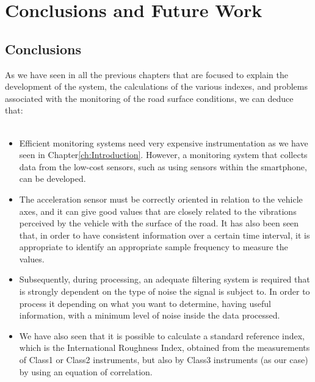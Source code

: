 \documentclass[tesi]{subfiles}
\begin{document}
\chapter{Conclusions and Future Work}\label{ch:c_and_fw}
\section{Conclusions}
As we have seen in all the previous chapters that are focused to explain the development of the system, the calculations of the various indexes, and problems associated with the monitoring of the road surface conditions, we can deduce that:\\\\
\begin{itemize}
\item Efficient monitoring systems need very expensive instrumentation as we have seen in Chapter\ref{ch:Introduction}. However, a monitoring system that collects data from the low-cost sensors, such as using sensors within the smartphone, can be developed.
\item The acceleration sensor must be correctly oriented in relation to the vehicle axes, and it can give good values that are closely related to the vibrations perceived by the vehicle with the surface of the road. It has also been seen that, in order to have consistent information over a certain time interval, it is appropriate to identify an appropriate sample frequency to measure the values.
\item Subsequently, during processing, an adequate filtering system is required that is strongly dependent on the type of noise the signal is subject to. In order to process it depending on what you want to determine, having useful information, with a minimum level of noise inside the data processed. 
\item We have also seen that it is possible to calculate a standard reference index, which is the International Roughness Index, obtained from the measurements of Class1 or Class2 instruments, but also by Class3 instruments (as our case) by using an equation of correlation. 
\end{itemize}
\end{document}
